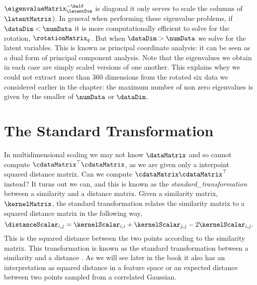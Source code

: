 $\eigenvalueMatrix_\latentDim^{-\half}$ is diagonal it only serves to
scale the columns of $\latentMatrix$). In general when performing
these eigenvalue problems, if $\dataDim<\numData$ it is more
computationally efficient to solve for the rotation,
$\rotationMatrix_{q}$. But when $\dataDim>\numData$ we solve for the
latent variables. This is known as principal coordinate analysis: it can be
seen as a dual form of principal component analysis. Note that the
eigenvalues we obtain in each case are simply scaled versions of one
another. This explains whey we could not extract more than 360
dimensions from the rotated six data we considered earlier in the
chapter: the maximum number of non zero eigenvalues is given by the
smaller of $\numData$ or $\dataDim$.


\section{The Standard Transformation}

In multidimensional scaling we may not know
$\dataMatrix$ and so cannot compute $\cdataMatrix^{\top}\cdataMatrix$,
as we are given only a interpoint squared distance matrix. Can we
compute $\cdataMatrix\cdataMatrix^{\top}$ instead? It turns out we
can, and this is known as the \emph{\gls{standard_transformation}} between a
similarity and a distance matrix. Given a similarity matrix, $\kernelMatrix$, the standard transformation relates the similarity matrix to a squared distance matrix in the following way,
\[
\distanceScalar_{i,j}=\kernelScalar_{i,i}+\kernelScalar_{j,j}-2\kernelScalar_{i,j}.
\]
This is the squared distance between the two points according to the
similarity matrix. This transformation is known as the standard
  transformation between a similarity and a distance \cite[pg
402]{Mardia:multivariate79}. As we will see later in the book it also
has an interpretation as squared distance in a feature space or an
expected distance between two points sampled from a correlated
Gaussian.

